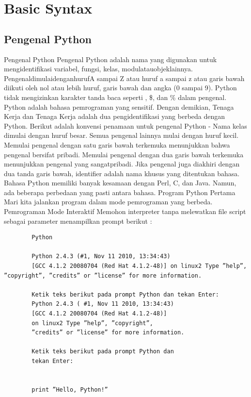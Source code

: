 


\section{Basic Syntax}
\subsection{Pengenal Python}
Pengenal Python Pengenal Python adalah nama yang digunakan untuk mengidentiﬁkasi variabel, fungsi, kelas, modulatauobjeklainnya. PengenaldimulaidenganhurufA sampai Z atau huruf a sampai z atau garis bawah  diikuti oleh nol atau lebih huruf, garis bawah dan angka (0 sampai 9). Python tidak mengizinkan karakter tanda baca seperti \@, \$, dan \% dalam pengenal. Python adalah bahasa pemrograman yang sensitif. Dengan demikian, Tenaga Kerja dan Tenaga Kerja adalah dua pengidentiﬁkasi yang berbeda dengan Python. Berikut adalah konvensi penamaan untuk pengenal Python - Nama kelas dimulai dengan huruf besar. Semua pengenal lainnya mulai dengan huruf kecil. Memulai pengenal dengan satu garis bawah terkemuka menunjukkan bahwa pengenal bersifat pribadi. Memulai pengenal dengan dua garis bawah terkemuka menunjukkan pengenal yang sangatpribadi. Jika pengenal juga diakhiri dengan dua tanda garis bawah, identiﬁer adalah nama khusus yang ditentukan bahasa. 
Bahasa Python memiliki banyak kesamaan dengan Perl, C, dan Java. Namun, ada beberapa perbedaan yang pasti antara bahasa. Program Python Pertama Mari kita jalankan program dalam mode pemrograman yang berbeda. Pemrograman Mode Interaktif Memohon interpreter tanpa melewatkan ﬁle script sebagai parameter menampilkan prompt berikut :
	\begin{verbatim}
		Python

		Python 2.4.3 (#1, Nov 11 2010, 13:34:43) 
		[GCC 4.1.2 20080704 (Red Hat 4.1.2-48)] on linux2 Type ”help”, ”copyright”, ”credits” or ”license” for more information.
		
		Ketik teks berikut pada prompt Python dan tekan Enter:
		Python 2.4.3 ( #1, Nov 11 2010, 13:34:43) 
		[GCC 4.1.2 20080704 (Red Hat 4.1.2-48)] 
		on linux2 Type ”help”, ”copyright”, 
		”credits” or ”license” for more information.

		Ketik teks berikut pada prompt Python dan 
		tekan Enter:

		
		print ”Hello, Python!”
	\end{verbatim}

